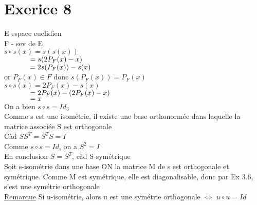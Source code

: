 \documentclass{article}
\author{Frederic Becerril}
\newcommand\tab[1][1cm]{\hspace*{#1}}
\begin{document}
\part*{Exerice 8}

E espace euclidien\\
F - sev  de E\\
$s \circ s(x) = s(s(x))$\\
$\tab[1.25cm] =s(2P_F(x) - x)$\\
$\tab[1.25cm] =2s(P_F(x)) - s(x)$\\
or $P_F(x) \in F$ donc $s(P_F(x)) = P_F(x)$\\
$s \circ s(x) = 2P_F(x) - s(x)$\\
$\tab[1.25cm] = 2P_F(x) - (2P_F(x) - x)$\\
$\tab[1.25cm] = x$\\
On a bien $s \circ s = Id_3$\\
Comme s est une isométrie, il existe une base orthonormée dans laquelle la matrice associée S est orthogonale\\
Càd $SS^T = S^TS = I$\\
Comme $s \circ s = Id$, on a $S^2 = I$\\
En conclusion $S = S^T$, càd S-symétrique\\
Soit s-isométrie dans une base ON la matrice M de s est orthogonale et symétrique. Comme M est 
symétrique, elle est diagonalisable, donc par Ex 3.6, s'est une symétrie orthogonale\\
\underline{Remarque} Si u-isométrie, alors u est une symétrie orthogonale $\Leftrightarrow$ $u \circ u = Id$
\end{document}
